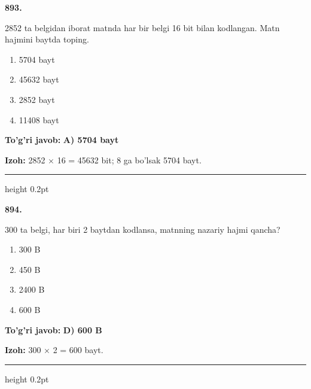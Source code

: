 \documentclass[10pt,a4paper,oneside]{article}
\begin{document}
\noindent\textbf{\color{ink}893.}
\par
2852 ta belgidan iborat matnda har bir belgi 16 bit bilan kodlangan. Matn hajmini baytda toping.
\begin{enumerate}[label=\Alph*),leftmargin=9mm]
\item 5704 bayt
\item 45632 bayt
\item 2852 bayt
\item 11408 bayt
\end{enumerate}
\begin{tcolorbox}[enhanced,breakable,colback=teal!4,colframe=teal!50!black,boxrule=0.5pt,arc=1.1mm,left=3mm,right=3mm,top=1.7mm,bottom=1.7mm,before skip=2mm,after skip=2mm]
\textbf{\color{teal}To'g'ri javob:} \textbf{A) 5704 bayt}
\par\smallskip
\textbf{Izoh:} 2852 \ensuremath{\times} 16 = 45632 bit; 8 ga bo'lsak 5704 bayt.
\end{tcolorbox}
\vspace{2mm}\hrule height 0.2pt \vspace{3mm}

\noindent\textbf{\color{ink}894.}
\par
300 ta belgi, har biri 2 baytdan kodlansa, matnning nazariy hajmi qancha?
\begin{enumerate}[label=\Alph*),leftmargin=9mm]
\item 300 B
\item 450 B
\item 2400 B
\item 600 B
\end{enumerate}
\begin{tcolorbox}[enhanced,breakable,colback=teal!4,colframe=teal!50!black,boxrule=0.5pt,arc=1.1mm,left=3mm,right=3mm,top=1.7mm,bottom=1.7mm,before skip=2mm,after skip=2mm]
\textbf{\color{teal}To'g'ri javob:} \textbf{D) 600 B}
\par\smallskip
\textbf{Izoh:} 300 \ensuremath{\times} 2 = 600 bayt.
\end{tcolorbox}
\vspace{2mm}\hrule height 0.2pt \vspace{3mm}
\end{document}
